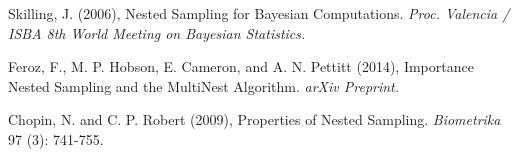 \documentclass[psamsfonts]{amsart}
\begin{document}
\begin{thebibliography}{100}

Skilling, J. (2006), Nested Sampling for Bayesian Computations. {\em Proc. Valencia / ISBA 8th World Meeting on Bayesian Statistics.}
 
Feroz, F., M. P. Hobson, E. Cameron, and A. N. Pettitt (2014), Importance Nested Sampling and the MultiNest Algorithm. {\em arXiv Preprint.}

Chopin, N. and C. P. Robert (2009), Properties of Nested Sampling. {\em Biometrika} 97 (3): 741-755.


\end{thebibliography}
\end{document}

